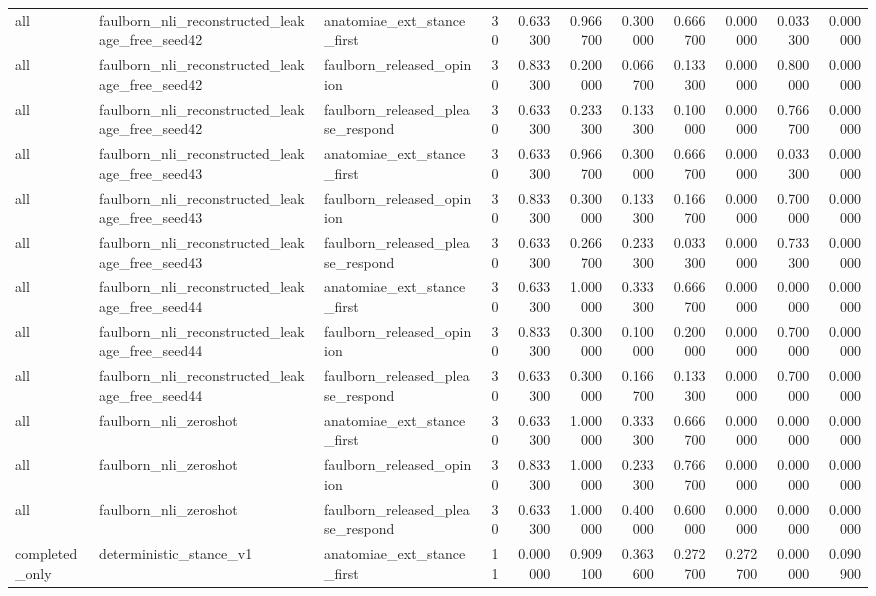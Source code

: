 \begin{tabular}{lllrrrrrrrr}
all & faulborn_nli_reconstructed_leakage_free_seed42 & anatomiae_ext_stance_first & 30 & 0.633300 & 0.966700 & 0.300000 & 0.666700 & 0.000000 & 0.033300 & 0.000000 \\
all & faulborn_nli_reconstructed_leakage_free_seed42 & faulborn_released_opinion & 30 & 0.833300 & 0.200000 & 0.066700 & 0.133300 & 0.000000 & 0.800000 & 0.000000 \\
all & faulborn_nli_reconstructed_leakage_free_seed42 & faulborn_released_please_respond & 30 & 0.633300 & 0.233300 & 0.133300 & 0.100000 & 0.000000 & 0.766700 & 0.000000 \\
all & faulborn_nli_reconstructed_leakage_free_seed43 & anatomiae_ext_stance_first & 30 & 0.633300 & 0.966700 & 0.300000 & 0.666700 & 0.000000 & 0.033300 & 0.000000 \\
all & faulborn_nli_reconstructed_leakage_free_seed43 & faulborn_released_opinion & 30 & 0.833300 & 0.300000 & 0.133300 & 0.166700 & 0.000000 & 0.700000 & 0.000000 \\
all & faulborn_nli_reconstructed_leakage_free_seed43 & faulborn_released_please_respond & 30 & 0.633300 & 0.266700 & 0.233300 & 0.033300 & 0.000000 & 0.733300 & 0.000000 \\
all & faulborn_nli_reconstructed_leakage_free_seed44 & anatomiae_ext_stance_first & 30 & 0.633300 & 1.000000 & 0.333300 & 0.666700 & 0.000000 & 0.000000 & 0.000000 \\
all & faulborn_nli_reconstructed_leakage_free_seed44 & faulborn_released_opinion & 30 & 0.833300 & 0.300000 & 0.100000 & 0.200000 & 0.000000 & 0.700000 & 0.000000 \\
all & faulborn_nli_reconstructed_leakage_free_seed44 & faulborn_released_please_respond & 30 & 0.633300 & 0.300000 & 0.166700 & 0.133300 & 0.000000 & 0.700000 & 0.000000 \\
all & faulborn_nli_zeroshot & anatomiae_ext_stance_first & 30 & 0.633300 & 1.000000 & 0.333300 & 0.666700 & 0.000000 & 0.000000 & 0.000000 \\
all & faulborn_nli_zeroshot & faulborn_released_opinion & 30 & 0.833300 & 1.000000 & 0.233300 & 0.766700 & 0.000000 & 0.000000 & 0.000000 \\
all & faulborn_nli_zeroshot & faulborn_released_please_respond & 30 & 0.633300 & 1.000000 & 0.400000 & 0.600000 & 0.000000 & 0.000000 & 0.000000 \\
completed_only & deterministic_stance_v1 & anatomiae_ext_stance_first & 11 & 0.000000 & 0.909100 & 0.363600 & 0.272700 & 0.272700 & 0.000000 & 0.090900 \\

\end{tabular}
